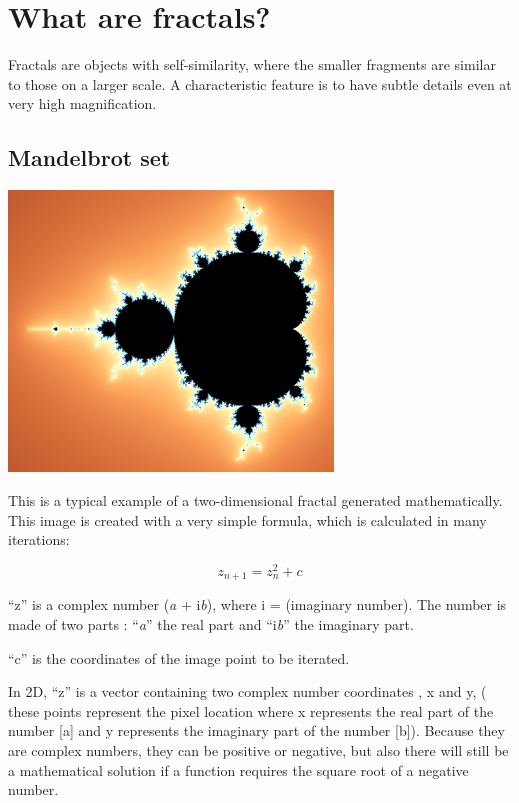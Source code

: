 \section{What are fractals?}\label{what-are-fractals}

Fractals are objects with self-similarity, where the smaller fragments
are similar to those on a larger scale. A characteristic feature is to
have subtle details even at very high magnification.

\subsection{Mandelbrot set}\label{mandelbrot-set}

\includegraphics[width=3.39514in,height=2.94167in]{img/manual/media/image1.png}

This is a typical example of a two-dimensional fractal generated
mathematically. This image is created with a very simple formula, which
is calculated in many iterations:

\[z_{n + 1} = z_{n}^{2} + c\]

``z'' is a complex number (\emph{a} + i\emph{b}), where i = (imaginary
number). The number is made of two parts : ``\emph{a}'' the real part
and ``i\emph{b}'' the imaginary part.

``c'' is the coordinates of the image point to be iterated.

In 2D, ``z'' is a vector containing two complex number coordinates , x
and y, ( these points represent the pixel location where x represents
the real part of the number {[}a{]} and y represents the imaginary part
of the number {[}b{]}). Because they are complex numbers, they can be
positive or negative, but also there will still be a mathematical
solution if a function requires the square root of a negative number.

